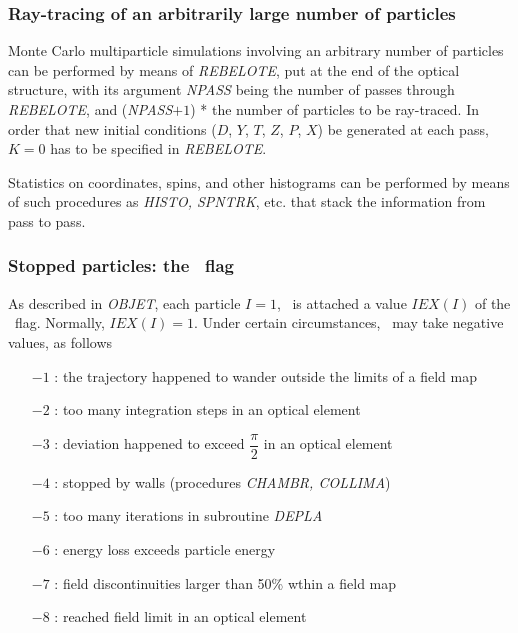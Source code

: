 \subsubsection{Ray-tracing of an arbitrarily large number of particles} %
      \label{sec4.6.4}

Monte Carlo multiparticle  simulations involving an 
arbitrary number of particles
can be performed by means of \textsl{REBELOTE}, put at the end of the optical
structure, with its argument \textsl{NPASS} being the number of passes through 
\textsl{REBELOTE}, and (\textsl{NPASS}$+ 1$) * \IMAX{}  
the number of particles to 
be ray-traced. In order that new initial conditions  ($D$, $Y$, $T$, $Z$, 
$P$, $X$) 
 be generated at each pass, $ K=0 $ has to be specified in \textsl{REBELOTE}.
 
\noindent Statistics on coordinates, spins, and other histograms can be
performed by means of such procedures as \textsl{HISTO, SPNTRK}, 
etc. that stack the information from pass to pass. 


\subsubsection{Stopped particles: the \IEX\ flag} 
\label{sec4.6.6}

As described in \textsl{OBJET}, each particle $I=1$, \IMAX\
 is attached a
value $IEX(I)$ of the \IEX\ flag. Normally, $IEX(I)=1$. Under certain 
circumstances, \IEX\ may take negative values, as follows

\begin{itemize}
\item[$-1$] :  the trajectory happened to wander outside the limits of a field map 
\item[$-2$] :  too many integration steps\index{integration step size} in an optical element
\item[$-3$] :  deviation happened to exceed $\dfrac{\pi}{2} $ in an optical element 
\item[$-4$] :  stopped by walls (procedures \textsl{CHAMBR, COLLIMA})  
\item[$-5$] :  too many iterations in subroutine \textsl{DEPLA}  
\item[$-6$] :  energy loss exceeds particle energy 
\item[$-7$] :  field discontinuities larger than 50\% wthin a field map
\item[$-8$] :  reached field limit in an optical element
\end{itemize}


